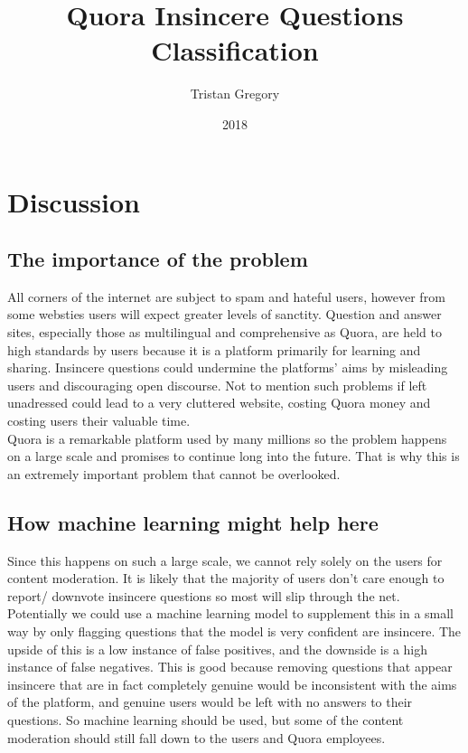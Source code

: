 \documentclass{article}
\title{Quora Insincere Questions Classification}
\author{Tristan Gregory}
\date{2018}
\begin{document}
\setlength{\parindent}{0cm}

\maketitle
\thispagestyle{empty}

\section{Discussion}
\subsection{The importance of the problem}

All corners of the internet are subject to spam and hateful users, however from some websties users will expect greater levels of sanctity. Question and answer sites, especially those as multilingual and comprehensive as Quora, are held to high standards by users because it is a platform primarily for learning and sharing. Insincere questions could undermine the platforms' aims by misleading users and discouraging open discourse. Not to mention such problems if left unadressed could lead to a very cluttered website, costing Quora money and costing users their valuable time.\\

Quora is a remarkable platform used by many millions so the problem happens on a large scale and promises to continue long into the future. That is why this is an extremely important problem that cannot be overlooked.

\subsection{How machine learning might help here}

Since this happens on such a large scale, we cannot rely solely on the users for content moderation. It is likely that the majority of users don't care enough to report/ downvote insincere questions so most will slip through the net.\\

Potentially we could use a machine learning model to supplement this in a small way by only flagging questions that the model is very confident are insincere. The upside of this is a low instance of false positives, and the downside is a high instance of false negatives. This is good because removing questions that appear insincere that are in fact completely genuine would be inconsistent with the aims of the platform, and genuine users would be left with no answers to their questions. So machine learning should be used, but some of the content moderation should still fall down to the users and Quora employees.
\end{document}
